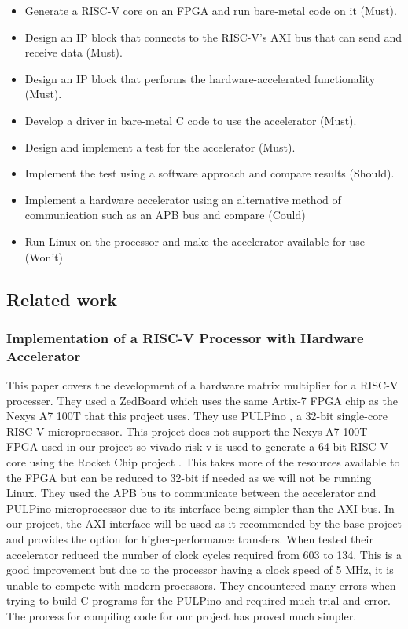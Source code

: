 \begin{itemize}
	\item Generate a RISC-V core on an FPGA and run bare-metal code on it (Must).
	\item Design an IP block that connects to the RISC-V's AXI bus that can send and receive data (Must).
	\item Design an IP block that performs the hardware-accelerated functionality (Must).
	\item Develop a driver in bare-metal C code to use the accelerator (Must).
	\item Design and implement a test for the accelerator (Must).
	\item Implement the test using a software approach and compare results (Should).
	\item Implement a hardware accelerator using an alternative method of communication such as an APB bus and compare (Could)
	\item Run Linux on the processor and make the accelerator available for use (Won't)
\end{itemize}

\subsection{Related work}
\subsubsection{Implementation of a RISC-V Processor with Hardware Accelerator \cite{risc-v_hard_accel}}
This paper covers the development of a hardware matrix multiplier for a RISC-V processer. They used a ZedBoard which uses the same Artix-7 FPGA chip as the Nexys A7 100T that this project uses. They use PULPino \cite{pulpino}, a 32-bit single-core RISC-V microprocessor. This project does not support the Nexys A7 100T FPGA used in our project so vivado-risk-v \cite{vivado-risk-v} is used to generate a 64-bit RISC-V core using the Rocket Chip project \cite{rocketchip}. This takes more of the resources available to the FPGA but can be reduced to 32-bit if needed as we will not be running Linux. They used the APB bus to communicate between the accelerator and PULPino microprocessor due to its interface being simpler than the AXI bus. In our project, the AXI interface will be used as it recommended by the base project and provides the option for higher-performance transfers. When tested their accelerator reduced the number of clock cycles required from 603 to 134. This is a good improvement but due to the processor having a clock speed of 5 MHz, it is unable to compete with modern processors. They encountered many errors when trying to build C programs for the PULPino and required much trial and error. The process for compiling code for our project has proved much simpler.

